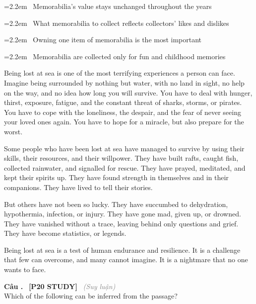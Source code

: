 \documentclass[12pt,a4paper,twoside]{article}
\newcounter{qcounter}
\newcommand{\question}[2][]{%
    \stepcounter{qcounter}%
    \par\vspace{6pt}%
    \noindent\textcolor{primaryBlue}{\textbf{Câu \theqcounter.}}~%
    \textcolor{secondaryBlue}{\small\textbf{[P20 STUDY]}}~%
    \if\relax\detokenize{#1}\relax\else\textcolor{gray}{\small\textit{(#1)}}~\fi\\[1pt]
    \noindent #2%
}
\newcommand{\choiceitem}[2]{%
    \tikz[baseline=-0.5ex]{%
        \node[draw=primaryBlue, circle, minimum size=1.5em, inner sep=0pt, thick] {\textbf{#1}};%
    }~#2%
}
\newenvironment{readingpassage}[1][]{%
    \begin{tcolorbox}[enhanced, colback=grayLight, colframe=secondaryBlue,
        coltitle=textDark, fonttitle=\bfseries, title={#1},
        rounded corners, arc=3mm, boxrule=1pt,
        left=15pt, right=15pt, top=10pt, bottom=10pt,
        breakable, before skip=10pt, after skip=10pt, drop fuzzy shadow]
    \setstretch{1.3}
}{\end{tcolorbox}}
\begin{document}
\par\vspace{4pt}
\noindent\hangindent=2.2em\choiceitem{A}{Memorabilia's value stays unchanged throughout the years}\par\vspace{4pt}
\noindent\hangindent=2.2em\choiceitem{B}{What memorabilia to collect reflects collectors' likes and dislikes}\par\vspace{4pt}
\noindent\hangindent=2.2em\choiceitem{C}{Owning one item of memorabilia is the most important}\par\vspace{4pt}
\noindent\hangindent=2.2em\choiceitem{D}{Memorabilia are collected only for fun and childhood memories}\par\vspace{4pt}

\begin{readingpassage}[]
Being lost at sea is one of the most terrifying experiences a person can face. Imagine being surrounded by nothing but water, with no land in sight, no help on the way, and no idea how long you will survive. You have to deal with hunger, thirst, exposure, fatigue, and the constant threat of sharks, storms, or pirates. You have to cope with the loneliness, the despair, and the fear of never seeing your loved ones again. You have to hope for a miracle, but also prepare for the worst.

Some people who have been lost at sea have managed to survive by using their skills, their resources, and their willpower. They have built rafts, caught fish, collected rainwater, and signalled for rescue. They have prayed, meditated, and kept their spirits up. They have found strength in themselves and in their companions. They have lived to tell their stories.

But others have not been so lucky. They have succumbed to dehydration, hypothermia, infection, or injury. They have gone mad, given up, or drowned. They have vanished without a trace, leaving behind only questions and grief. They have become statistics, or legends.

Being lost at sea is a test of human endurance and resilience. It is a challenge that few can overcome, and many cannot imagine. It is a nightmare that no one wants to face.
\end{readingpassage}

\question[Suy luận]{Which of the following can be inferred from the passage?}
\end{document}

